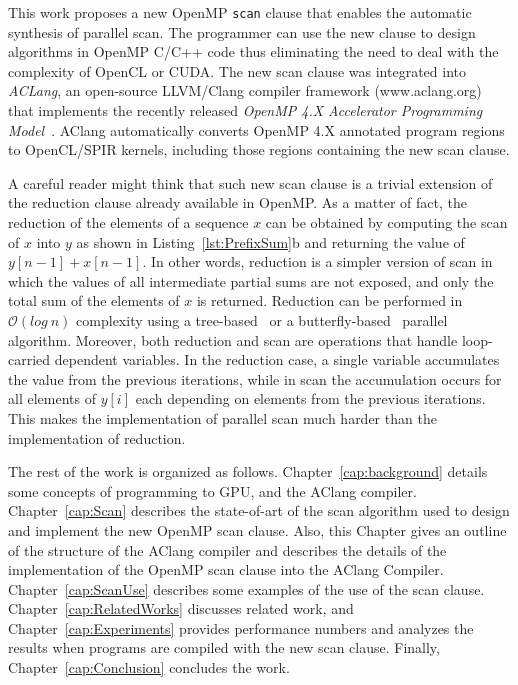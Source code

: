\documentclass[Ingles]{ic-tese-v1}
\newcommand{\rcap}[1]{Chapter~\ref{cap:#1}}
\newcommand{\rlsts}[2]{Listing~\ref{lst:#1}{#2}}
\begin{document}
This work proposes a new OpenMP \texttt{scan} clause that enables the
automatic synthesis of parallel  scan.  The programmer can
use the new  clause to  design algorithms in OpenMP C/C++ code
thus eliminating the need to deal with  the complexity of OpenCL or CUDA.
The  new   scan  clause   was  integrated  into   \textit{ACLang},  an
open-source LLVM/Clang compiler framework (www.aclang.org) that
implements  the  recently   released  \textit{OpenMP  4.X  Accelerator
	Programming   Model}~\cite{MPereira2017}.     AClang   automatically
converts OpenMP 4.X annotated program regions to OpenCL/SPIR kernels,
including those regions containing the new scan clause.

A careful  reader might think that  such new scan clause  is a trivial
extension of the  reduction clause already available in  OpenMP.  As a
matter of fact, the reduction of the elements of a sequence $x$ can be
obtained  by  computing  the  scan  of   $x$  into  $y$  as  shown  in
\rlsts{PrefixSum}{b} and returning the value of $y[n-1] + x[n-1]$.  In
other  words, reduction  is a  simpler version  of scan  in which  the
values of all intermediate partial sums  are not exposed, and only the
total  sum of  the  elements of  $x$ is  returned.   Reduction can  be
performed    in    $\mathcal{O}(log\    n)$   complexity    using    a
tree-based~\cite{tree-based}                    or                   a
butterfly-based~\cite{butterfly-based} parallel  algorithm.  Moreover,
both  reduction  and  scan  are operations  that  handle  loop-carried
dependent  variables.   In  the  reduction  case,  a  single  variable
accumulates the value from the  previous iterations, while in scan the
accumulation  occurs for  all  elements of  $y[i]$  each depending  on
elements from the previous  iterations.  This makes the implementation
of parallel scan much harder than the implementation of reduction.

The rest of the work is organized as follows. \rcap{background} details
some concepts of programming to GPU, and the AClang compiler. \rcap{Scan}
describes the state-of-art of the scan algorithm used to design and implement
the new OpenMP scan clause. Also, this Chapter gives an outline of the
structure of the AClang compiler and describes the details of the
implementation of the OpenMP scan clause into the AClang Compiler.
\rcap{ScanUse} describes some examples of the use of the scan clause.
\rcap{RelatedWorks} discusses related work, and \rcap{Experiments} provides
performance numbers and analyzes the results when programs are compiled with
the new scan clause. Finally, \rcap{Conclusion} concludes the work.
\end{document}
